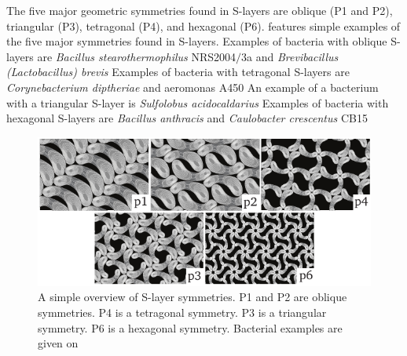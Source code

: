 \label{sec:bacterial-examples}
The five major geometric symmetries found in \acp{S-layer} are oblique (P1 and P2), triangular (P3), tetragonal (P4), and hexagonal (P6).  features simple
examples of the five major symmetries found in \acp{S-layer}. Examples of bacteria with oblique \acp{S-layer} are \textit{Bacillus stearothermophilus}
NRS2004$/$3a and \textit{Brevibacillus
  (Lactobacillus) brevis} Examples of bacteria with tetragonal \acp{S-layer} are
\textit{Corynebacterium diptheriae} and \acl{aeromonas} A450 An example of a bacterium with a triangular \ac{S-layer}
is \textit{Sulfolobus acidocaldarius} Examples of bacteria with hexagonal \acp{S-layer} are \textit{Bacillus anthracis} and
\textit{Caulobacter crescentus} CB15

\begin{figure}[htb] %
  \begin{center}
    \includegraphics[]{intro/img/symmetries.pdf}
  \end{center}
  \caption[A simple overview of \ac{S-layer} symmetries]{A simple overview of \ac{S-layer} symmetries. P1 and P2 are oblique symmetries. P4 is a tetragonal symmetry. P3 is a
triangular symmetry. P6 is a hexagonal symmetry. Bacterial examples are given on
}
  \label{fig:symmetries}
\end{figure}
   
